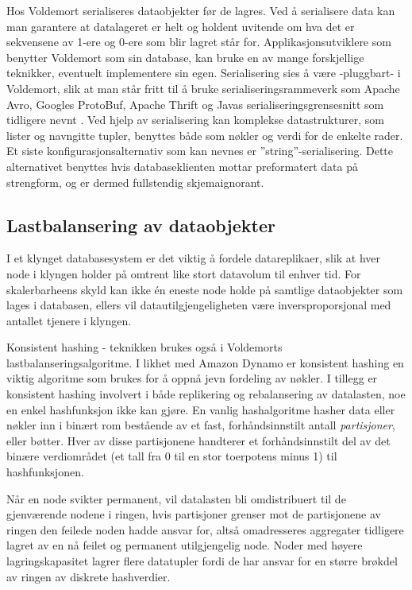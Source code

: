 Hos Voldemort serialiseres dataobjekter før de lagres. Ved å serialisere data kan man garantere at datalageret er helt og holdent uvitende om hva det er sekvensene av 1-ere og 0-ere som blir lagret står for. Applikasjonsutviklere som benytter Voldemort som sin database, kan bruke en av mange forskjellige teknikker, eventuelt implementere sin egen. Serialisering sies å være -pluggbart- i Voldemort, slik at man står fritt til å bruke serialiseringsrammeverk som Apache Avro, Googles ProtoBuf, Apache Thrift og Javas serialiseringsgrensesnitt som tidligere nevnt \citep{kreps2009}. Ved hjelp av serialisering kan komplekse datastrukturer, som lister og navngitte tupler, benyttes både som nøkler og verdi for de enkelte rader. Et siste konfigurasjonsalternativ som kan nevnes er ''string''-serialisering. Dette alternativet benyttes hvis databaseklienten mottar preformatert data på strengform, og er dermed fullstendig skjemaignorant.

\subsection{Lastbalansering av dataobjekter}

I et klynget databasesystem er det viktig å fordele datareplikaer, slik at hver node i klyngen holder på omtrent like stort datavolum til enhver tid. For skalerbarheens skyld kan ikke én eneste node holde på samtlige dataobjekter som lages i databasen, ellers vil datautilgjengeligheten være inversproporsjonal med antallet tjenere i klyngen.

Konsistent hashing - teknikken brukes også i Voldemorts lastbalanseringsalgoritme. I likhet med Amazon Dynamo er konsistent hashing en viktig algoritme som brukes for å oppnå jevn fordeling av nøkler. I tillegg er konsistent hashing involvert i både replikering og rebalansering av datalasten, noe en enkel hashfunksjon ikke kan gjøre. En vanlig hashalgoritme hasher data eller nøkler inn i binært rom bestående av et fast, forhåndsinnstilt antall \emph{partisjoner}, eller bøtter. Hver av disse partisjonene handterer et forhåndsinnstilt del av det binære verdiområdet (et tall fra 0 til en stor toerpotens minus 1) til hashfunksjonen. %

Når en node svikter permanent, vil datalasten bli omdistribuert til de gjenværende nodene i ringen, hvis partisjoner grenser mot de partisjonene av ringen den feilede noden hadde ansvar for, altså omadresseres aggregater tidligere lagret av en nå feilet og permanent utilgjengelig node. Noder med høyere lagringskapasitet lagrer flere datatupler fordi de har ansvar for en større brøkdel av ringen av diskrete hashverdier. %

